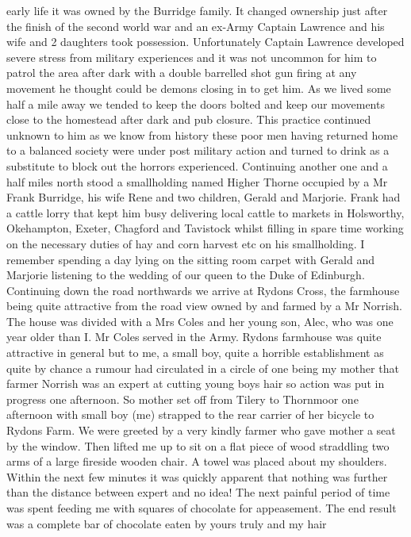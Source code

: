 early life it was owned by the Burridge family. It changed ownership just after
the finish of the second world war and an ex-Army Captain Lawrence and his wife
and 2 daughters took possession. Unfortunately Captain Lawrence developed
severe stress from military experiences and it was not uncommon for him to
patrol the area after dark with a double barrelled shot gun firing at any
movement he thought could be demons closing in to get him. As we lived some
half a mile away we tended to keep the doors bolted and keep our movements
close to the homestead after dark and pub closure. This practice continued
unknown to him as we know from history these poor men having returned home to a
balanced society were under post military action and turned to drink as a
substitute to block out the horrors experienced. Continuing another one and a
half miles north stood a smallholding named Higher Thorne occupied by a Mr
Frank Burridge, his wife Rene and two children, Gerald and Marjorie. Frank had
a cattle lorry that kept him busy delivering local cattle to markets in
Holsworthy, Okehampton, Exeter, Chagford and Tavistock whilst filling in spare
time working on the necessary duties of hay and corn harvest etc on his
smallholding. I remember spending a day lying on the sitting room carpet with
Gerald and Marjorie listening to the wedding of our queen to the Duke of
Edinburgh. Continuing down the road northwards we arrive at Rydons Cross, the
farmhouse being quite attractive from the road view owned by and farmed by a Mr
Norrish. The house was divided  with a Mrs Coles and her young son, Alec, who
was one year older than I. Mr Coles served in the Army. Rydons farmhouse was
quite attractive in general but to me, a small boy, quite a horrible
establishment as quite by chance a rumour had circulated in a circle of one
being my mother that farmer Norrish was an expert at cutting young boys hair so
action was put in progress one afternoon. So mother set off from Tilery to
Thornmoor one afternoon with small boy (me) strapped to the rear carrier of her
bicycle to Rydons Farm. We were greeted by a very kindly farmer  who gave
mother a seat by the window. Then lifted me up to sit on a flat piece of wood
straddling two arms of a large fireside wooden chair. A towel was placed about
my shoulders. Within the next few minutes it was quickly apparent that nothing
was further than the distance between expert and no idea! The next painful
period of time was spent feeding me with squares of chocolate for appeasement.
The end result was a complete bar of chocolate eaten by yours truly and my hair
